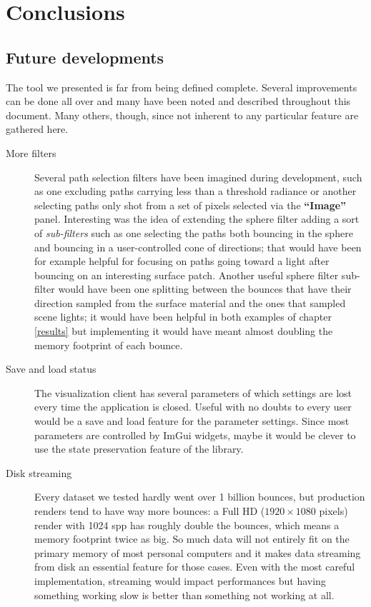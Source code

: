 \chapter{Conclusions}



\section{Future developments}

The tool we presented is far from being defined complete. Several improvements can be done all over and many have been noted and described throughout this document. Many others, though, since not inherent to any particular feature are gathered here.

\begin{description}
	\item[More filters] Several path selection filters have been imagined during development, such as one excluding paths carrying less than a threshold radiance or another selecting paths only shot from a set of pixels selected via the \textbf{“Image”} panel. Interesting was the idea of extending the sphere filter adding a sort of \textit{sub-filters} such as one selecting the paths both bouncing in the sphere and bouncing in a user-controlled cone of directions; that would have been for example helpful for focusing on paths going toward a light after bouncing on an interesting surface patch. Another useful sphere filter sub-filter would have been one splitting between the bounces that have their direction sampled from the surface material and the ones that sampled scene lights; it would have been helpful in both examples of chapter \ref{results} but implementing it would have meant almost doubling the memory footprint of each bounce. 
	\item[Save and load status] The visualization client has several parameters of which settings are lost every time the application is closed. Useful with no doubts to every user would be a save and load feature for the parameter settings. Since most parameters are controlled by ImGui widgets, maybe it would be clever to use the state preservation feature of the library.
	\item[Disk streaming] Every dataset we tested hardly went over 1 billion bounces, but production renders tend to have way more bounces: a Full HD ($1920 \times 1080$ pixels) render with 1024 spp has roughly double the bounces, which means a memory footprint twice as big. So much data will not entirely fit on the primary memory of most personal computers and it makes data streaming from disk an essential feature for those cases. Even with the most careful implementation, streaming would impact performances but having something working slow is better than something not working at all. 

\end{description}
